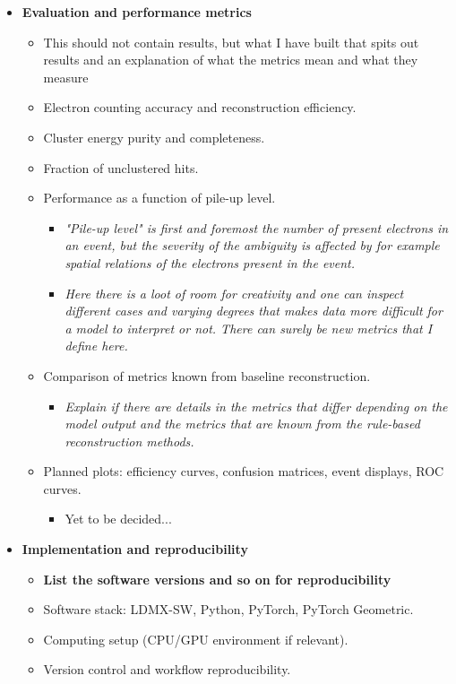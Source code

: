 \begin{itemize}
\item \textbf{Evaluation and performance metrics}
\begin{itemize}
    \item This should not contain results, but what I have built that spits out results and an explanation of what the metrics mean and what they measure
    \item Electron counting accuracy and reconstruction efficiency.
    \item Cluster energy purity and completeness.
    \item Fraction of unclustered hits.
    \item Performance as a function of pile-up level.
    \begin{itemize}
        \item \textit{"Pile-up level" is first and foremost the number of present electrons in an event, but the severity of the ambiguity is affected by for example spatial relations of the electrons present in the event. }
        \item \textit{Here there is a loot of room for creativity and one can inspect different cases and varying degrees that makes data more difficult for a model to interpret or not. There can surely be new metrics that I define here.}
    \end{itemize}
    \item Comparison of metrics known from baseline reconstruction. 
    \begin{itemize}
        \item \textit{Explain if there are details in the metrics that differ depending on the model output and the metrics that are known from the rule-based reconstruction methods. }
    \end{itemize}
    \item Planned plots: efficiency curves, confusion matrices, event displays, ROC curves.
    \begin{itemize}
        \item Yet to be decided...
    \end{itemize}
\end{itemize}

\item \textbf{Implementation and reproducibility}
\begin{itemize}
    \item \textbf{List the software versions and so on for reproducibility}
    \item Software stack: LDMX-SW, Python, PyTorch, PyTorch Geometric.
    \item Computing setup (CPU/GPU environment if relevant).
    \item Version control and workflow reproducibility.
\end{itemize}


\end{itemize}
